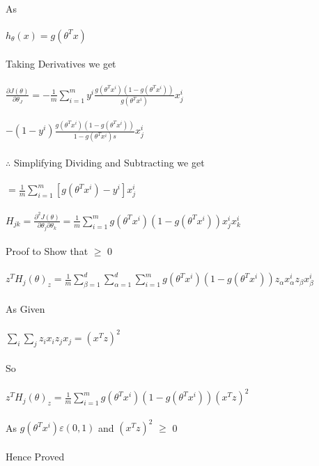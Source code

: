 \newcommand\tab[1][1cm]{\hspace*{#1}}
\begin{answer}
	\\
	As  \\ \\
	\tab[1cm]$h_\theta(x) = g(\theta^T x)$ \\ \\
	Taking Derivatives we get\\ \\
	\tab[1cm]$\frac{\partial J(\theta)}{\partial \theta_J} = - \frac{1}{m} \sum^m_{i=1} y^i \frac{g(\theta^Tx^i)(1 - g(\theta^Tx^i))}{g(\theta^Tx^i)} x_j^i$ \\ \\
	\tab[2.25cm]$-(1- y^i) \frac{g(\theta^Tx^i)(1 - g(\theta^Tx^i))}{1 - g(\theta^Tx^i)s} x_j^i$ \\ \\
	\tab[1cm]$\therefore$ Simplifying Dividing and Subtracting we get \\ \\
	\tab[2.25cm]$= \frac{1}{m} \sum^m_{i=1}[g(\theta^Tx^i) - y^i] x_j^i$\\ \\
	\tab$H_{jk} = \frac{\partial^2J(\theta)}{\partial \theta_j \partial \theta_k} = \frac{1}{m} \sum^m_{i=1} g(\theta^Tx^i)(1 - g(\theta^Tx^i)) x_j^i x_k^i$ \\ \\
	Proof to Show that $\geq$ 0 \\ \\ 
	\tab$z^TH_j(\theta)_z = \frac{1}{m} \sum^d_{\beta=1}\sum^d_{\alpha=1}\sum^m_{i=1} g(\theta^Tx^i)(1 - g(\theta^Tx^i)) z_\alpha x_\alpha^i z_\beta x_\beta^i$ \\ \\
	As Given \\ \\ 
	\tab$\sum_{i} \sum_{j} z_ix_iz_jx_j = (x^Tz)^2$ \\ \\
	So \\ \\
	\tab$z^TH_j(\theta)_z = \frac{1}{m} \sum^m_{i=1} g(\theta^Tx^i)(1 - g(\theta^Tx^i)) (x^Tz)^2$ \\ \\
	As $g(\theta^Tx^i) \varepsilon (0, 1)$ and $(x^Tz)^2$ $\geq$ 0 \\ \\ 
	Hence Proved \\ \\ 
\end{answer}
